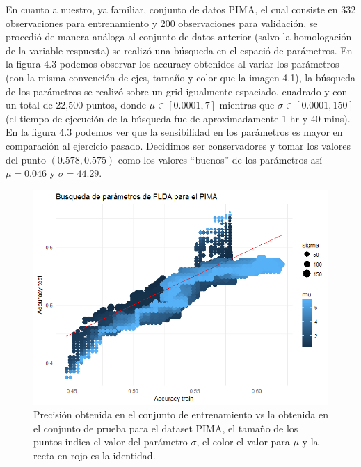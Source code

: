 \documentclass[paper=letter, fontsize=11pt]{scrartcl}
\numberwithin{equation}{section} %
\numberwithin{figure}{section} %
\numberwithin{table}{section} %
\begin{document}
En cuanto a nuestro, ya familiar, conjunto de datos PIMA, el cual consiste en 332 observaciones para entrenamiento y 200 observaciones para validación, se procedió de manera análoga al conjunto de datos anterior (salvo la homologación de la variable respuesta) se realizó una búsqueda en el espació de parámetros. En la figura 4.3 podemos observar los accuracy obtenidos al variar los parámetros (con la misma convención de ejes, tamaño y color que la imagen 4.1), la búsqueda de los parámetros se realizó sobre un grid igualmente espaciado, cuadrado y con un total de  22,500 puntos, donde $\mu \in [0.0001, 7]$ mientras que $\sigma \in [0.0001, 150]$ (el tiempo de ejecución de la búsqueda fue de aproximadamente 1 hr y 40 mins).\\
En la figura 4.3 podemos ver que la sensibilidad en los parámetros es mayor en comparación al ejercicio pasado. Decidimos ser conservadores y tomar los valores del punto $(0.578, 0.575 )$ como los valores “buenos” de los parámetros así $\mu = 0.046$ y $\sigma=44.29$.

\begin{figure}[H]
  \begin{center}
    \includegraphics[scale=0.75]{grid_pimas.png}
    \caption{Precisión obtenida en el conjunto de entrenamiento vs la obtenida en el conjunto de prueba para el dataset PIMA, el tamaño de los puntos indica el valor del parámetro $\sigma$, el color el valor para $\mu$ y la recta en rojo es la identidad.   }
    \label{figura4_3}
  \end{center}
\end{figure}
\end{document}
